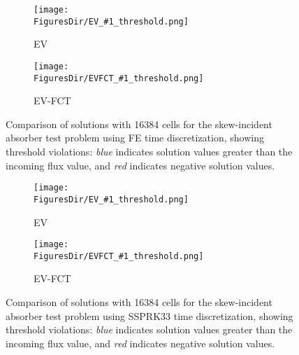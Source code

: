 \documentclass{article}
\newcommand{\FiguresDir}{../images}
\newcommand{\FigureType}{figure}
\begin{document}
\newcommand{\MyFigure}[1]{
\begin{\FigureType}[htb]
   \centering
   \begin{subfigure}{0.45\textwidth}
      \texttt{[image: \\FiguresDir/EV\_\#1\_threshold.png]}
      \caption{EV}
   \end{subfigure}
   \begin{subfigure}{0.45\textwidth}
      \texttt{[image: \\FiguresDir/EVFCT\_\#1\_threshold.png]}
      \caption{EV-FCT}
   \end{subfigure}
   \caption{Comparison of solutions with 16384 cells for the skew-incident
     absorber test problem using #1 time discretization, showing
     threshold violations: \emph{blue} indicates solution values greater than the
     incoming flux value, and \emph{red} indicates negative solution values.}
\end{\FigureType}
}

\MyFigure{FE}

\MyFigure{SSPRK33}
\end{document}
